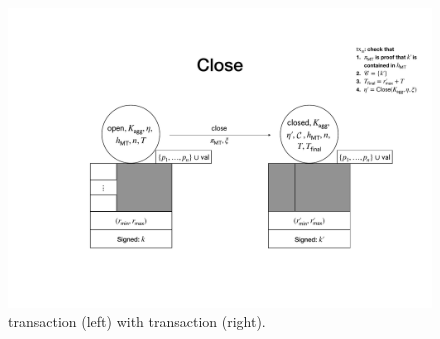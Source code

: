 \begin{figure}

  \centering


  \includegraphics[width=\textwidth/2]{figures/SM_open_closed.pdf}

  \caption{\mtxCCom{} transaction (left) with \mtxClose{}
    transaction (right).}
  \label{fig:SM_open_closed}

\end{figure}



